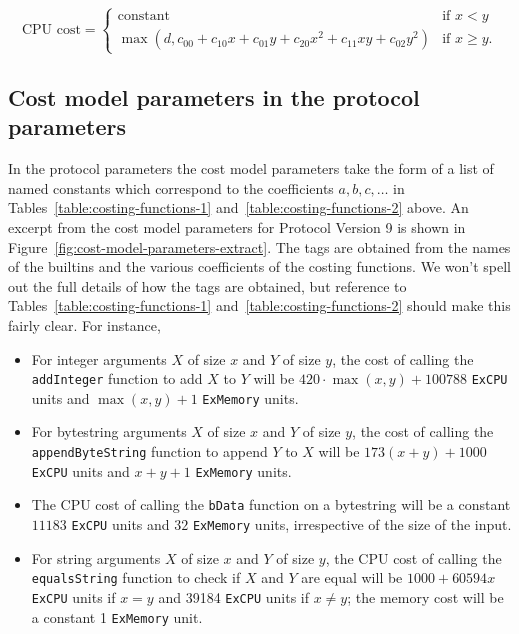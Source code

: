 \documentclass[a4paper]{article}
\newcommand\const{\ensuremath{\text{constant}}}
\begin{document}
$$
\text{CPU cost} = \begin{cases}
  \const & \text{if $x<y$} \\
  \max(d, c_{00} + c_{10}x + c_{01}y + c_{20}x^2 + c_{11}xy + c_{02}y^2) & \text{if $x \geq y$}.
\end{cases}
$$

\subsection{Cost model parameters in the protocol parameters}
\label{sec:cost-model-parameters}
In the protocol parameters the cost model parameters take the form of a list of
named constants which correspond to the coefficients $a, b, c, \ldots$ in
Tables~\ref{table:costing-functions-1} and~\ref{table:costing-functions-2}
above.  An excerpt from the cost model parameters for Protocol Version 9 is
shown in Figure~\ref{fig:cost-model-parameters-extract}.  The tags are obtained
from the names of the builtins and the various coefficients of the costing
functions.  We won't spell out the full details of how the tags are obtained,
but reference to Tables~\ref{table:costing-functions-1}
and~\ref{table:costing-functions-2} should make this fairly clear.  For
instance,
\begin{itemize}
\item For integer arguments $X$ of size $x$ and $Y$ of size $y$, the cost of
  calling the \texttt{addInteger} function to add $X$ to $Y$ will be
  $420\cdot\max(x,y) + 100788$ \texttt{ExCPU} units and $\max(x,y)+1$
  \texttt{ExMemory} units.
\item For bytestring arguments $X$ of size $x$ and $Y$ of size $y$, the cost of
  calling the \texttt{appendByteString} function to append $Y$ to $X$ will be
  $173(x+y)+1000$ \texttt{ExCPU} units and $x+y+1$ \texttt{ExMemory} units.
\item The CPU cost of calling the \texttt{bData} function on a bytestring will
  be a constant $11183$ \texttt{ExCPU} units and $32$ \texttt{ExMemory} units,
  irrespective of the size of the input.
\item For string arguments $X$ of size $x$ and $Y$ of size $y$, the CPU cost of
  calling the \texttt{equalsString} function to check if $X$ and $Y$ are equal
  will be $1000 + 60594x$ \texttt{ExCPU} units if $x=y$ and 39184 \texttt{ExCPU}
  units if $x \neq y$; the memory cost will be a constant 1 \texttt{ExMemory}
  unit.
\end{itemize}
\end{document}
